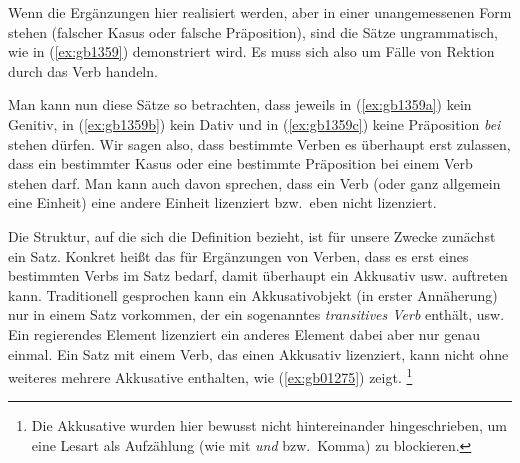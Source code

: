 \begin{exe}
  \ex\label{ex:gb1358}
  \begin{xlist}
  \end{xlist}
\end{exe}

Wenn die Ergänzungen hier realisiert werden, aber in einer unangemessenen Form stehen (falscher Kasus oder falsche Präposition), sind die Sätze ungrammatisch, wie in (\ref{ex:gb1359}) demonstriert wird.
Es muss sich also um Fälle von Rektion durch das Verb handeln.

\begin{exe}
  \ex\label{ex:gb1359}
  \begin{xlist}
  \end{xlist}
\end{exe}

Man kann nun diese Sätze so betrachten, dass jeweils in (\ref{ex:gb1359a}) kein Genitiv, in (\ref{ex:gb1359b}) kein Dativ und in (\ref{ex:gb1359c}) keine Präposition \textit{bei} stehen dürfen.
Wir sagen also, dass bestimmte Verben es überhaupt erst zulassen, dass ein bestimmter Kasus oder eine bestimmte Präposition bei einem Verb stehen darf.
Man kann auch davon sprechen, dass ein Verb (oder ganz allgemein eine Einheit) eine andere Einheit lizenziert bzw.\ eben nicht lizenziert.




Die Struktur, auf die sich die Definition bezieht, ist für unsere Zwecke zunächst ein Satz.
Konkret heißt das \zB für Ergänzungen von Verben, dass es erst eines bestimmten Verbs im Satz bedarf, damit überhaupt ein Akkusativ usw. auftreten kann.
Traditionell gesprochen kann ein Akkusativobjekt (in erster Annäherung) nur in einem Satz vorkommen, der ein sogenanntes \textit{transitives Verb} enthält, usw.
Ein regierendes Element lizenziert ein anderes Element dabei aber nur genau einmal.
Ein Satz mit einem Verb, das einen Akkusativ lizenziert, kann nicht ohne weiteres mehrere Akkusative enthalten, wie (\ref{ex:gb01275}) zeigt.%
\footnote{Die Akkusative wurden hier bewusst nicht hintereinander hingeschrieben, um eine Lesart als Aufzählung (wie mit \textit{und} bzw.\ Komma) zu blockieren.}

